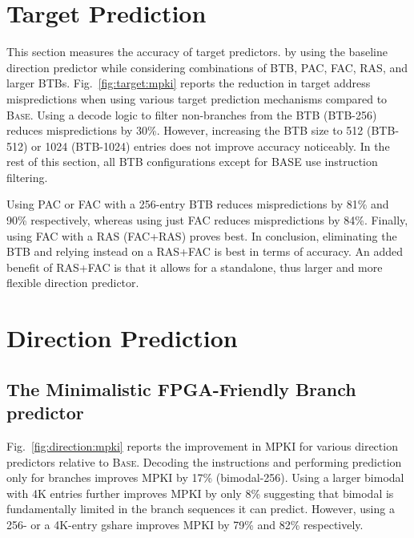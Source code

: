 \section{Target Prediction}
\label{sec:eval:target}

This section measures the accuracy of target predictors. by using the baseline direction predictor while considering  combinations of BTB, PAC, FAC, RAS, and larger BTBs. Fig.~\ref{fig:target:mpki} reports the reduction in target address mispredictions when using various target prediction mechanisms compared to \textsc{Base}. Using a decode logic to filter non-branches from the BTB (BTB-256) reduces mispredictions by 30\%. However, increasing the BTB size to 512 (BTB-512) or 1024 (BTB-1024) entries does not improve accuracy noticeably. In the rest of this section, all BTB configurations except for BASE use instruction filtering.

Using PAC or FAC with a 256-entry BTB reduces mispredictions by 81\% and 90\% respectively, whereas using just FAC reduces mispredictions by 84\%. Finally, using FAC with a RAS (FAC+RAS) proves best. In conclusion, eliminating the BTB and relying instead on a RAS+FAC is best in terms of accuracy. An added benefit of RAS+FAC is that it allows for a standalone, thus larger and more flexible direction predictor. 




\section{Direction Prediction}
\label{sec:eval:direction}


\subsection{The Minimalistic FPGA-Friendly Branch predictor}
\label{sec:eval:direction:min}

Fig.~\ref{fig:direction:mpki} reports the improvement in MPKI for various direction predictors relative to \textsc{Base}. Decoding the instructions and performing prediction only for branches improves MPKI by 17\% (bimodal-256). Using a larger bimodal with 4K entries further improves MPKI by only 8\% suggesting that bimodal is fundamentally limited in the branch sequences it can predict. However, using a 256- or a 4K-entry gshare improves MPKI by 79\% and 82\% respectively. 

